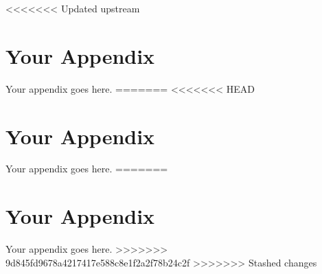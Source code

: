 <<<<<<< Updated upstream
\chapter{Your Appendix}
\label{appendix_a}

Your appendix goes here.
=======
<<<<<<< HEAD
\chapter{Your Appendix}
\label{appendix_a}

Your appendix goes here.
=======
\chapter{Your Appendix}
\label{appendix_a}

Your appendix goes here.
>>>>>>> 9d845fd9678a4217417e588c8e1f2a2f78b24c2f
>>>>>>> Stashed changes
